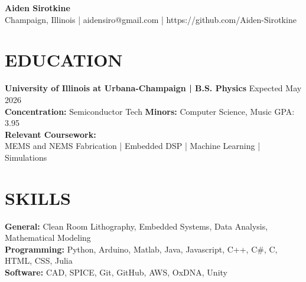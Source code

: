 \documentclass[a4paper,12pt]{extarticle}
\newcommand{\comment}[1]{}
\begin{document}
\pagestyle{empty}

\begin{center}
\textbf{\Huge Aiden Sirotkine}\\[2pt] %
Champaign, Illinois | 
{aidensiro@gmail.com} | 
https://github.com/Aiden-Sirotkine 
\comment{
| Country Citizen %
}
\end{center}



\section*{EDUCATION}
\noindent
\textbf{University of Illinois at Urbana-Champaign
| B.S. Physics}
\hfill Expected May 2026 \\
\textbf{Concentration:} Semiconductor Tech \hspace{0.5cm}
\textbf{Minors:} Computer Science, Music
\hfill
GPA: 3.95
\\

\noindent
\textbf{Relevant Coursework:} \\
MEMS and NEMS Fabrication | Embedded DSP |
Machine Learning | Simulations


\section*{SKILLS}
    \textbf{General:} Clean Room Lithography, Embedded Systems, Data Analysis, 
    Mathematical Modeling 
    \\
    \textbf{Programming:} Python, Arduino, Matlab, Java, Javascript, C++, C\#, C, HTML, CSS, Julia %
    \\
    \textbf{Software:} CAD, SPICE, Git, GitHub, AWS, OxDNA, Unity %
\end{document}
